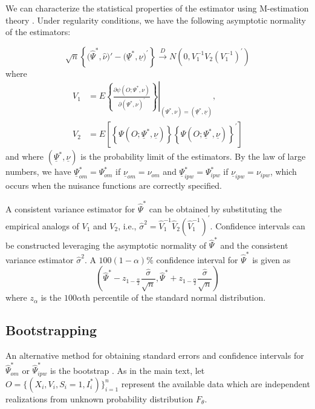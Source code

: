 \begin{appendix}
    We can characterize the statistical properties of the estimator using M-estimation theory \cite{stefanski_calculus_2002}. Under regularity conditions, we have the following asymptotic normality of the estimators:

    \[\sqrt{n}\left\{\big(\widehat{\Psi}^*, \widehat{\nu}\big)'-\big(\underline{\Psi}^*, \underline{\nu}\big)^\prime \right\} \xrightarrow{D} N\left(0, V_1^{-1} V_2\left(V_1^{-1}\right)^{\prime}\right)\]
    where 
    \begin{align*}
        V_1&=\left.E\left\{\frac{\partial \psi\left(O ; \Psi^*, \nu\right)}{\partial\left(\Psi^*, \nu\right)^{\prime}}\right\}\right|_{\left(\Psi^*, \nu\right)=\left(\underline{\Psi}^*, \underline{\nu}\right)}, \\
        V_2&=E\left[\left\{\Psi\left(O ;\underline{\Psi}^*, \underline{\nu}\right)\right\}\left\{\Psi\left(O ; \underline{\Psi}^*, \underline{\nu}\right)\right\}^{\prime}\right]
    \end{align*}
and where $\left(\underline{\Psi}^*, \underline{\nu}\right)$ is the probability limit of the estimators. By the law of large numbers, we have $\underline{\Psi}^*_{om}=\Psi^*_{om}$ if  $\underline{\nu}_{om}=\nu_{om}$ and $\underline{\Psi}^*_{ipw}=\Psi^*_{ipw}$ if $\underline{\nu}_{ipw}=\nu_{ipw}$, which occurs when the nuisance functions are correctly specified.

A consistent variance estimator for $\widehat{\Psi}^*$ can be obtained by substituting the empirical analogs of $V_1$ and $V_2$, i.e., $\widehat{\sigma}^2=\widehat{V}_1^{-1} \widehat{V}_2(\widehat{V}_1^{-1})^{\prime}$. Confidence intervals can be constructed leveraging the asymptotic normality of $\widehat{\Psi}^*$ and the consistent variance estimator $\widehat{\sigma}^2$. A $100(1-\alpha) \%$ confidence interval for $\widehat{\Psi}^*$ is given as
$$
\left(\widehat{\Psi}^*-z_{1-\frac{\alpha}{2}} \frac{\widehat{\sigma}}{\sqrt{n}}, \widehat{\Psi}^*+z_{1-\frac{\alpha}{2}} \frac{\widehat{\sigma}}{\sqrt{n}}\right)
$$
where $z_\alpha$ is the $100 \alpha$th percentile of the standard normal distribution.

\subsection{Bootstrapping}
An alternative method for obtaining standard errors and confidence intervals for $\widehat{\Psi}^*_{om}$ or $\widehat{\Psi}^*_{ipw}$ is the  bootstrap \cite{diciccio_bootstrap_1987}. As in the main text, let $O = \{(X_i, V_i, S_i = 1, I_i^*)\}_{i=1}^n$ represent the available data which are  independent realizations from unknown probability distribution $F_{\theta}$. 


\end{appendix}
